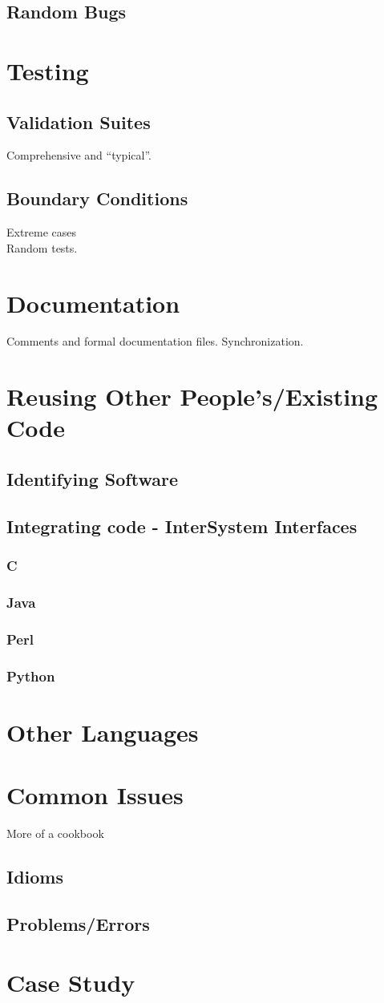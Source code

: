   \subsection{Random Bugs}

\section{Testing}
  \subsection{Validation Suites}
    Comprehensive and ``typical''.
  \subsection{Boundary Conditions}
    Extreme cases \\
    Random tests.

\section{Documentation}
   Comments and formal documentation files.
   Synchronization.

\section{Reusing Other People's/Existing Code}
 \subsection{Identifying Software}
 \subsection{Integrating code - InterSystem Interfaces}
   \subsubsection{C}
   \subsubsection{Java}
   \subsubsection{Perl}
   \subsubsection{Python}

\section{Other Languages}

\section{Common Issues}
  More of a cookbook
   \subsection{Idioms}
   \subsection{Problems/Errors}

\section{Case Study}
